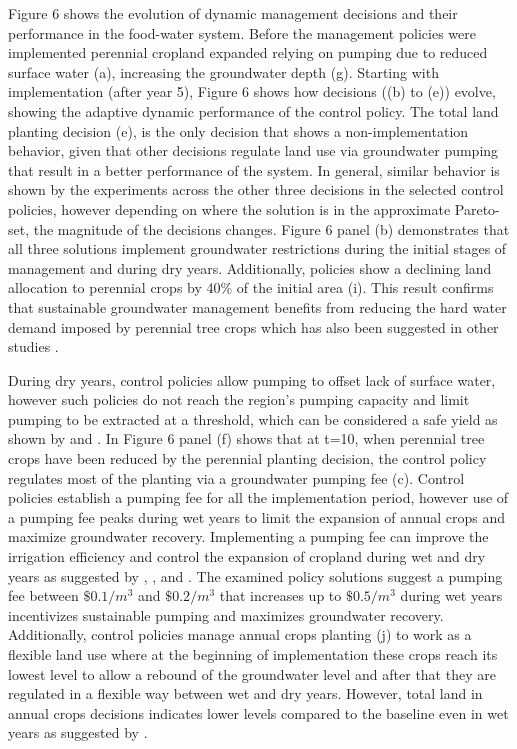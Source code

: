 \documentclass[a4paper,fleqn]{cas-sc}
\begin{document}
Figure 6 shows the evolution of dynamic management decisions and their performance in the food-water system. Before the management policies were implemented perennial cropland expanded relying on pumping due to reduced surface water (a), increasing the groundwater depth (g). Starting with implementation (after year 5), Figure 6 shows how decisions ((b) to (e)) evolve, showing the adaptive dynamic performance of the control policy. The total land planting decision (e), is the only decision that shows a non-implementation behavior, given that other decisions regulate land use via groundwater pumping that result in a better performance of the system. In general, similar behavior is shown by the experiments across the other three decisions in the selected control policies, however depending on where the solution is in the approximate Pareto-set, the magnitude of the decisions changes. Figure 6 panel (b) demonstrates that all three solutions implement groundwater restrictions during the initial stages of management and during dry years. Additionally, policies show a declining land allocation to perennial crops by 40\% of the initial area (i). This result confirms that sustainable groundwater management benefits from reducing the hard water demand imposed by perennial tree crops which has also been suggested in other studies \citep{qin_flexibility_2019,mall_water_2019}. 

During dry years, control policies allow pumping to offset lack of surface water, however such policies do not reach the region’s pumping capacity and limit pumping to be extracted at a threshold, which can be considered a safe yield as shown by \citet{miro_framework_2019} and \citet{macewan_hydroeconomic_2017}. In Figure 6 panel (f) shows that at t=10, when perennial tree crops have been reduced by the perennial planting decision, the control policy regulates most of the planting via a groundwater pumping fee (c). Control policies establish a pumping fee for all the implementation period, however use of a pumping fee peaks during wet years to limit the expansion of annual crops and maximize groundwater recovery. Implementing a pumping fee can improve the irrigation efficiency and control the expansion of cropland during wet and dry years as suggested by \citet{stone_economic_2022}, \citet{graveline_combining_2020}, and \citet{khan_effect_2019}. The examined policy solutions suggest a pumping fee between $\$0.1/m^{3}$ and $\$0.2/m^{3}$ that increases up to $\$0.5/m^{3}$ during wet years incentivizes sustainable pumping and maximizes groundwater recovery. Additionally, control policies manage annual crops planting (j) to work as a flexible land use where at the beginning of implementation these crops reach its lowest level to allow a rebound of the groundwater level and after that they are regulated in a flexible way between wet and dry years. However, total land in annual crops decisions indicates lower levels compared to the baseline even in wet years as suggested by \citet{hanak_water_2019}. 
\end{document}
